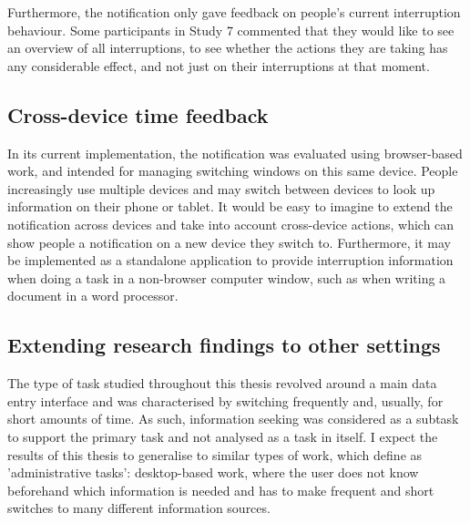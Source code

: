 Furthermore, the notification only gave feedback on people’s current interruption behaviour. Some participants in Study 7 commented that they would like to see an overview of all interruptions, to see whether the actions they are taking has any considerable effect, and not just on their interruptions at that moment.

\subsection{Cross-device time feedback}
In its current implementation, the notification was evaluated using browser-based work, and intended for managing switching windows on this same device. People increasingly use multiple devices and may switch between devices to look up information on their phone or tablet. It would be easy to imagine to extend the notification across devices and take into account cross-device actions, which can show people a notification on a new device they switch to. Furthermore, it may be implemented as a standalone application to provide interruption information when doing a task in a non-browser computer window, such as when writing a document in a word processor.

\subsection{Extending research findings to other settings}
The type of task studied throughout this thesis revolved around a main data entry interface and was characterised by switching frequently and, usually, for short amounts of time. As such, information seeking was considered as a subtask to support the primary task and not analysed as a task in itself. 
I expect the results of this thesis to generalise to similar types of work, which \citet{Bondarenko2005} define as 'administrative tasks': desktop-based work, where the user does not know beforehand which information is needed and has to make frequent and short switches to many different information sources. 

